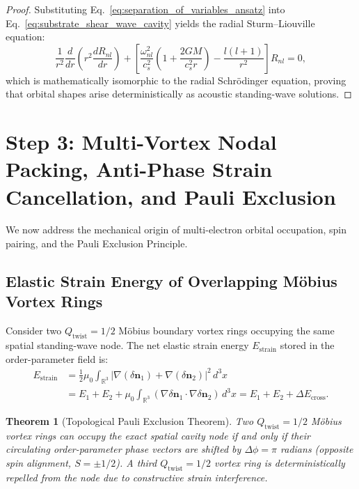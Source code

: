 \documentclass[11pt,a4paper]{article}
\newtheorem{thm}{Theorem}
\begin{document}
	\begin{proof}
		Substituting Eq.\ \eqref{eq:separation_of_variables_ansatz} into Eq.\ \eqref{eq:substrate_shear_wave_cavity} yields the radial Sturm--Liouville equation:
		\begin{equation}
			\frac{1}{r^2} \frac{d}{dr} \left( r^2 \frac{d R_{nl}}{dr} \right) + \left[ \frac{\omega_{nl}^2}{c_s^2} \left(1 + \frac{2GM}{c_s^2 r}\right) - \frac{l(l+1)}{r^2} \right] R_{nl} = 0,
			\label{eq:sturm_liouville_radial}
		\end{equation}
		which is mathematically isomorphic to the radial Schrödinger equation, proving that orbital shapes arise deterministically as acoustic standing-wave solutions.
	\end{proof}
	
	\section{Step 3: Multi-Vortex Nodal Packing, Anti-Phase Strain Cancellation, and Pauli Exclusion}
	\label{sec:step3_multi_vortex_packing}
	
	We now address the mechanical origin of multi-electron orbital occupation, spin pairing, and the Pauli Exclusion Principle.
	
	\subsection{Elastic Strain Energy of Overlapping Möbius Vortex Rings}
	Consider two $Q_{\text{twist}} = 1/2$ Möbius boundary vortex rings occupying the same spatial standing-wave node. The net elastic strain energy $E_{\text{strain}}$ stored in the order-parameter field is:
	\begin{align}
		E_{\text{strain}} &= \frac{1}{2}\mu_0 \int_{\mathbb{R}^3} |\nabla (\delta \mathbf{n}_1) + \nabla (\delta \mathbf{n}_2)|^2 \, d^3x \nonumber \\
		&= E_1 + E_2 + \mu_0 \int_{\mathbb{R}^3} (\nabla \delta \mathbf{n}_1 \cdot \nabla \delta \mathbf{n}_2) \, d^3x = E_1 + E_2 + \Delta E_{\text{cross}}.
		\label{eq:strain_energy_overlap}
	\end{align}
	
	\begin{thm}[Topological Pauli Exclusion Theorem]
		\label{thm:pauli_exclusion}
		Two $Q_{\text{twist}} = 1/2$ Möbius vortex rings can occupy the exact spatial cavity node if and only if their circulating order-parameter phase vectors are shifted by $\Delta \phi = \pi$ radians (opposite spin alignment, $S = \pm 1/2$). A third $Q_{\text{twist}} = 1/2$ vortex ring is deterministically repelled from the node due to constructive strain interference.
	\end{thm}
	
\end{document}
